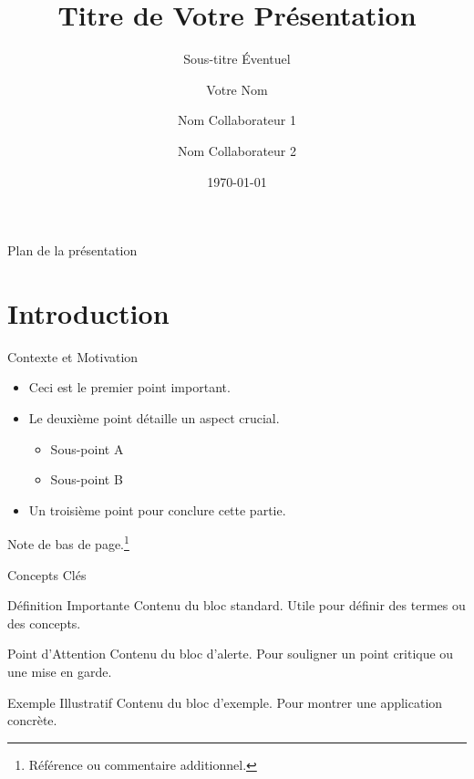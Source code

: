 \documentclass[aspectratio=169]{beamer} %
\title{Titre de Votre Présentation}
\subtitle{Sous-titre Éventuel}
\author{Votre Nom \and Nom Collaborateur 1 \and Nom Collaborateur 2}
\institute{Université Paris Dauphine - PSL \\ Votre laboratoire/département}
\date{\today}
\begin{document}
{ %
  \frame{\titlepage}
}

\begin{frame}{Plan de la présentation}
  \tableofcontents %
\end{frame}

\section{Introduction}

\begin{frame}{Contexte et Motivation}
  \begin{itemize}
    \item Ceci est le premier point important.
    \item Le deuxième point détaille un aspect crucial.
      \begin{itemize}
        \item Sous-point A
        \item Sous-point B
      \end{itemize}
    \item Un troisième point pour conclure cette partie.
  \end{itemize}
  \vfill %
  Note de bas de page.\footnote{Référence ou commentaire additionnel.}
\end{frame}

\begin{frame}{Concepts Clés}
  \begin{block}{Définition Importante}
    Contenu du bloc standard. Utile pour définir des termes ou des concepts.
  \end{block}

  \begin{alertblock}{Point d'Attention}
    Contenu du bloc d'alerte. Pour souligner un point critique ou une mise en garde.
  \end{alertblock}

  \begin{exampleblock}{Exemple Illustratif}
    Contenu du bloc d'exemple. Pour montrer une application concrète.
  \end{exampleblock}
\end{frame}
\end{document}
